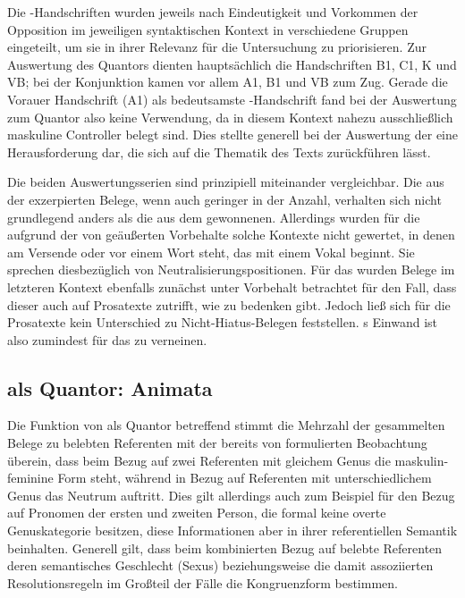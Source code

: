 Die \KC{}-Handschriften wurden jeweils nach Eindeutigkeit und Vorkommen
der Opposition im jeweiligen syntaktischen Kontext in verschiedene Gruppen
eingeteilt, um sie in ihrer Relevanz für die Untersuchung zu priorisieren. Zur
Auswertung des Quantors  dienten hauptsächlich die Handschriften
B1, C1, K und VB; bei der
Konjunktion  kamen vor allem A1, B1 und
VB zum Zug. Gerade die Vorauer Handschrift (A1) als
bedeutsamste \KC{}-Handschrift fand bei der Auswertung zum Quantor
 also keine Verwendung, da in diesem Kontext nahezu
ausschließlich maskuline Controller belegt sind. Dies stellte generell bei der
Auswertung der \KC{} eine Herausforderung dar, die sich auf die Thematik
des Texts zurückführen lässt.

Die beiden Auswertungsserien sind prinzipiell miteinander vergleichbar. Die aus
der \KC{} exzerpierten Belege, wenn auch geringer in der Anzahl, verhalten
sich nicht grundlegend anders als die aus dem \CAO{} gewonnenen.
Allerdings wurden für die \KC{} aufgrund der von
\textcites[89--90]{askedal1973}[191]{gjelsten1980} geäußerten Vorbehalte solche
Kontexte nicht gewertet, in denen  am Versende oder vor einem Wort
steht, das mit einem Vokal beginnt. Sie sprechen diesbezüglich von
Neutralisierungs\-positionen. Für das \CAO{} wurden Belege im
letzteren Kontext ebenfalls zunächst unter Vorbehalt betrachtet für den Fall,
dass dieser auch auf Prosatexte zutrifft, wie \citet[92]{askedal1973} zu
bedenken gibt. Jedoch ließ sich für die Prosatexte kein Unterschied zu
Nicht-\allowbreak{}Hiatus-\allowbreak{}Belegen feststellen.
\citeauthor{askedal1973}s Einwand ist also zumindest für das \CAO{} zu
verneinen.

\subsection{ als Quantor: Animata}

Die Funktion von  als Quantor betreffend stimmt die Mehrzahl
der gesammelten Belege zu belebten Referenten mit der bereits von
\textcites[312]{grimm1890}[39--41]{behaghel1928} formulierten Beobachtung
überein, dass beim Bezug auf zwei Referenten mit gleichem Genus die
maskulin-feminine Form steht, während in Bezug auf Referenten mit
unterschiedlichem Genus das Neutrum auftritt. Dies gilt allerdings auch zum
Beispiel für den Bezug auf Pronomen der ersten und zweiten Person, die formal
keine overte Genuskategorie besitzen, diese Informationen aber in ihrer
referentiellen Semantik beinhalten. Generell gilt, dass beim kombinierten Bezug
auf belebte Referenten deren semantisches Geschlecht (Sexus) beziehungsweise
die damit assoziierten Resolutionsregeln im Großteil der Fälle die
Kongruenzform bestimmen.

